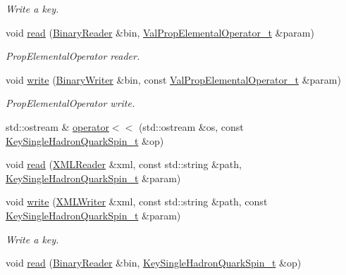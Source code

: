 \begin{DoxyCompactItemize}
\begin{DoxyCompactList}\small\item\em Write a key. \end{DoxyCompactList}\item 
void \mbox{\hyperlink{namespaceHadron_aa192df4bf85988ad36b7c9b7c0c83dd3}{read}} (\mbox{\hyperlink{classADATIO_1_1BinaryReader}{Binary\+Reader}} \&bin, \mbox{\hyperlink{structHadron_1_1ValPropElementalOperator__t}{Val\+Prop\+Elemental\+Operator\+\_\+t}} \&param)
\begin{DoxyCompactList}\small\item\em Prop\+Elemental\+Operator reader. \end{DoxyCompactList}\item 
void \mbox{\hyperlink{namespaceHadron_a4e777dd6c1ccf60b80a383fd5901627b}{write}} (\mbox{\hyperlink{classADATIO_1_1BinaryWriter}{Binary\+Writer}} \&bin, const \mbox{\hyperlink{structHadron_1_1ValPropElementalOperator__t}{Val\+Prop\+Elemental\+Operator\+\_\+t}} \&param)
\begin{DoxyCompactList}\small\item\em Prop\+Elemental\+Operator write. \end{DoxyCompactList}\item 
std\+::ostream \& \mbox{\hyperlink{namespaceHadron_a0dfff614f40f815cfb78d828c07bc8aa}{operator$<$$<$}} (std\+::ostream \&os, const \mbox{\hyperlink{structHadron_1_1KeySingleHadronQuarkSpin__t}{Key\+Single\+Hadron\+Quark\+Spin\+\_\+t}} \&op)
\item 
void \mbox{\hyperlink{namespaceHadron_a35b28e298745916c37daa929a874e099}{read}} (\mbox{\hyperlink{classADATXML_1_1XMLReader}{X\+M\+L\+Reader}} \&xml, const std\+::string \&path, \mbox{\hyperlink{structHadron_1_1KeySingleHadronQuarkSpin__t}{Key\+Single\+Hadron\+Quark\+Spin\+\_\+t}} \&param)
\item 
void \mbox{\hyperlink{namespaceHadron_a536d0c7d1bd20e64ba84b0588b3696f9}{write}} (\mbox{\hyperlink{classADATXML_1_1XMLWriter}{X\+M\+L\+Writer}} \&xml, const std\+::string \&path, const \mbox{\hyperlink{structHadron_1_1KeySingleHadronQuarkSpin__t}{Key\+Single\+Hadron\+Quark\+Spin\+\_\+t}} \&param)
\begin{DoxyCompactList}\small\item\em Write a key. \end{DoxyCompactList}\item 
void \mbox{\hyperlink{namespaceHadron_a02133bc62e51d4baa57fb5ba0742ff43}{read}} (\mbox{\hyperlink{classADATIO_1_1BinaryReader}{Binary\+Reader}} \&bin, \mbox{\hyperlink{structHadron_1_1KeySingleHadronQuarkSpin__t}{Key\+Single\+Hadron\+Quark\+Spin\+\_\+t}} \&op)

\end{DoxyCompactItemize}

